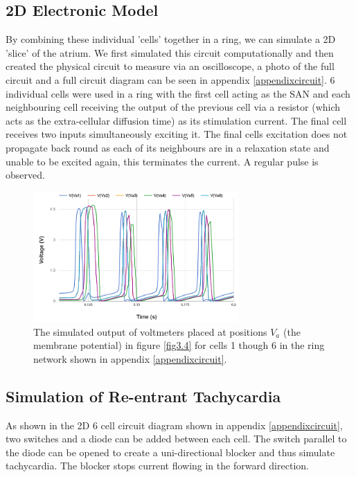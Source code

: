 \subsection{2D Electronic Model}
By combining these individual 'cells' together in a ring, we can simulate a 2D 'slice' of the atrium. We first simulated this circuit computationally and then created the physical circuit to measure via an oscilloscope, a photo of the full circuit and a full circuit diagram can be seen in appendix \ref{appendixcircuit}. 6 individual cells were used in a ring with the first cell acting as the SAN and each neighbouring cell receiving the output of the previous cell via a resistor (which acts as the extra-cellular diffusion time) as its stimulation current. The final cell receives two inputs simultaneously exciting it. The final cells excitation does not propagate back round as each of its neighbours are in a relaxation state and unable to be excited again, this terminates the current. A regular pulse is observed.
\begin{figure}[H]
    \centering
    \includegraphics[width=0.7\textwidth]{images/6cellnoblock.png}
    \caption{The simulated output of voltmeters placed at positions $V_a$ (the membrane potential) in figure \ref{fig3.4} for cells 1 though 6 in the ring network shown in appendix \ref{appendixcircuit}.}
    \label{fig3.7}
\end{figure}


\subsection{Simulation of Re-entrant Tachycardia}
As shown in the 2D 6 cell circuit diagram shown in appendix \ref{appendixcircuit}, two switches and a diode can be added between each cell. The switch parallel to the diode can be opened to create a uni-directional blocker and thus simulate tachycardia. The blocker stops current flowing in the forward direction. \par

